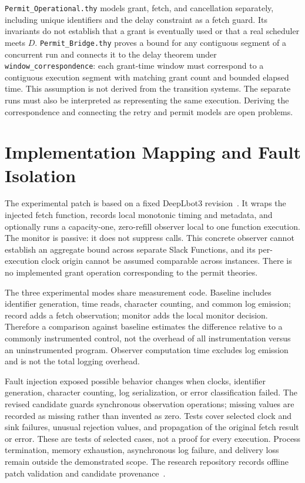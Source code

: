 \documentclass[10pt,twocolumn]{article}
\begin{document}
\texttt{Permit\_Operational.thy} models grant, fetch, and cancellation separately, including unique identifiers and the delay constraint as a fetch guard. Its invariants do not establish that a grant is eventually used or that a real scheduler meets $D$. \texttt{Permit\_Bridge.thy} proves a bound for any contiguous segment of a concurrent run and connects it to the delay theorem under \texttt{window\_correspondence}: each grant-time window must correspond to a contiguous execution segment with matching grant count and bounded elapsed time. This assumption is not derived from the transition systems. The separate runs must also be interpreted as representing the same execution. Deriving the correspondence and connecting the retry and permit models are open problems.

\section{Implementation Mapping and Fault Isolation}
The experimental patch is based on a fixed DeepLbot3 revision~\cite{repository}. It wraps the injected fetch function, records local monotonic timing and metadata, and optionally runs a capacity-one, zero-refill observer local to one function execution. The monitor is passive: it does not suppress calls. This concrete observer cannot establish an aggregate bound across separate Slack Functions, and its per-execution clock origin cannot be assumed comparable across instances. There is no implemented grant operation corresponding to the permit theories.

The three experimental modes share measurement code. Baseline includes identifier generation, time reads, character counting, and common log emission; record adds a fetch observation; monitor adds the local monitor decision. Therefore a comparison against baseline estimates the difference relative to a commonly instrumented control, not the overhead of all instrumentation versus an uninstrumented program. Observer computation time excludes log emission and is not the total logging overhead.

Fault injection exposed possible behavior changes when clocks, identifier generation, character counting, log serialization, or error classification failed. The revised candidate guards synchronous observation operations; missing values are recorded as missing rather than invented as zero. Tests cover selected clock and sink failures, unusual rejection values, and propagation of the original fetch result or error. These are tests of selected cases, not a proof for every execution. Process termination, memory exhaustion, asynchronous log failure, and delivery loss remain outside the demonstrated scope. The research repository records offline patch validation and candidate provenance~\cite{repository}.
\end{document}
